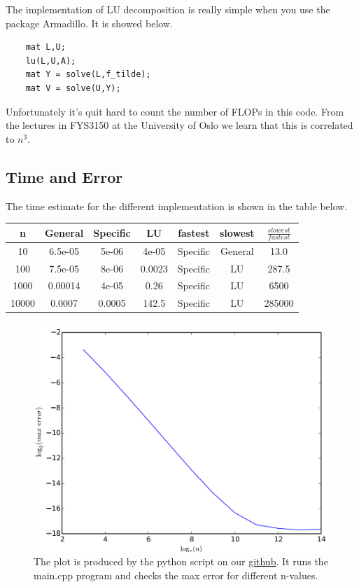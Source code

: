 \documentclass[12pt,norsk,a4paper]{article}
\begin{document}
The implementation of LU decomposition is really simple when you use the package Armadillo. It is showed below.
\begin{lstlisting}
    mat L,U;
    lu(L,U,A);
    mat Y = solve(L,f_tilde);
    mat V = solve(U,Y);
\end{lstlisting}

Unfortunately it's quit hard to count the number of FLOPs in this code. From the lectures in FYS3150 at the University of Oslo we learn that this is correlated to $n^3$.

\subsection{Time and Error}

The time estimate for the different implementation is shown in the table below. \\

	\begin{tabular}{|c|c|c|c|c|c|c|}
		\hline 
		n & General & Specific & LU & fastest & slowest & $\frac{slowest}{fastest}$\\ 
		\hline
		10 & 6.5e-05 & 5e-06 & 4e-05 & Specific & General & 13.0\\ 
		\hline 
		100 & 7.5e-05 & 8e-06 & 0.0023 & Specific & LU & 287.5\\ 
		\hline 
		1000 & 0.00014 & 4e-05 & 0.26 & Specific & LU & 6500\\ 
		\hline
		10000 & 0.0007 & 0.0005 & 142.5 & Specific & LU & 285000 \\ 
		\hline
	\end{tabular}


	\begin{figure}[H]
		\centering
		\includegraphics[width=0.7\linewidth]{bilder/error}
		\caption{The plot is produced by the python script on our \href{https://github.com/erikfsk/Project-1}{github}. It runs the main.cpp program and checks the max error for different n-values.}
		\label{fig:error}
	\end{figure}
\end{document}
